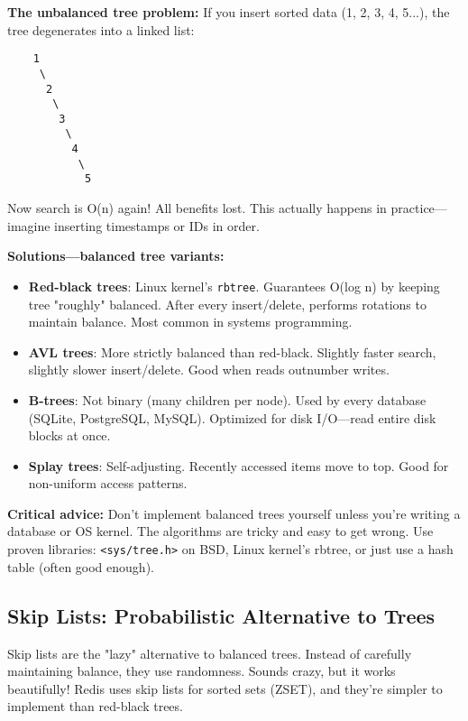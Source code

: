 \begin{warningbox}
\textbf{The unbalanced tree problem:} If you insert sorted data (1, 2, 3, 4, 5...), the tree degenerates into a linked list:
\begin{verbatim}
    1
     \
      2
       \
        3
         \
          4
           \
            5
\end{verbatim}

Now search is O(n) again! All benefits lost. This actually happens in practice---imagine inserting timestamps or IDs in order.

\textbf{Solutions---balanced tree variants:}
\begin{itemize}
    \item \textbf{Red-black trees}: Linux kernel's \texttt{rbtree}. Guarantees O(log n) by keeping tree "roughly" balanced. After every insert/delete, performs rotations to maintain balance. Most common in systems programming.

    \item \textbf{AVL trees}: More strictly balanced than red-black. Slightly faster search, slightly slower insert/delete. Good when reads outnumber writes.

    \item \textbf{B-trees}: Not binary (many children per node). Used by every database (SQLite, PostgreSQL, MySQL). Optimized for disk I/O---read entire disk blocks at once.

    \item \textbf{Splay trees}: Self-adjusting. Recently accessed items move to top. Good for non-uniform access patterns.
\end{itemize}

\textbf{Critical advice:} Don't implement balanced trees yourself unless you're writing a database or OS kernel. The algorithms are tricky and easy to get wrong. Use proven libraries: \texttt{<sys/tree.h>} on BSD, Linux kernel's rbtree, or just use a hash table (often good enough).
\end{warningbox}

\subsection{Skip Lists: Probabilistic Alternative to Trees}

Skip lists are the "lazy" alternative to balanced trees. Instead of carefully maintaining balance, they use randomness. Sounds crazy, but it works beautifully! Redis uses skip lists for sorted sets (ZSET), and they're simpler to implement than red-black trees.

